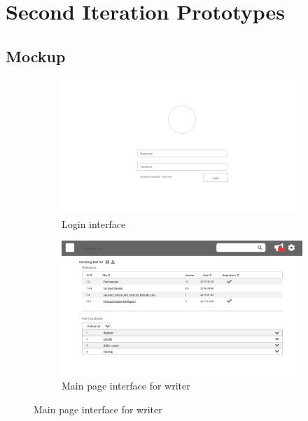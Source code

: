 \chapter{Second Iteration Prototypes}\label{chap:2-Prototypes}
\section{Mockup}\label{sec:Mock}

\begin{figure}[H]
	\centering
	\begin{subfigure}[b]{0.48\textwidth}
		\includegraphics[width=\textwidth]{billeder/iteration2Prototyper/Page_1.jpg}
		\caption{Login interface}
		\label{fig:4-Login}
	\end{subfigure}
	\quad
	\begin{subfigure}[b]{0.48\textwidth}
		\includegraphics[width=\textwidth]{billeder/iteration2Prototyper/Page_2.jpg}
		\caption{Main page interface for writer}
		\label{fig:4-Main}
	\end{subfigure}
\end{figure}
